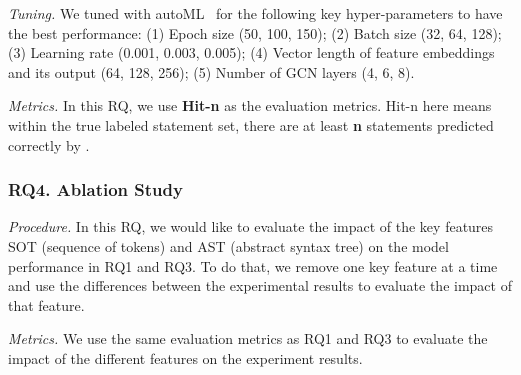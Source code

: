 {\em Tuning.} We tuned {\tool} with autoML~\cite{NNI} for the following key hyper-parameters to have the best performance: (1) Epoch size (50, 100, 150); (2) Batch size (32, 64, 128); (3) Learning rate (0.001, 0.003, 0.005); (4) Vector length of feature embeddings and its output (64, 128, 256); (5) Number of GCN layers (4, 6, 8).

{\em Metrics.} In this RQ, we use \textbf{Hit-n} as the evaluation metrics. Hit-n here means within the true labeled statement set, there are at least \textbf{n} statements predicted correctly by \tool.

\subsubsection{RQ4. Ablation Study}

{\em Procedure.} In this RQ, we would like to evaluate the impact of the key features SOT (sequence of tokens) and AST (abstract syntax tree) on the model performance in RQ1 and RQ3. To do that, we remove one key feature at a time and use the differences between the experimental results to evaluate the impact of that feature.

{\em Metrics.} We use the same evaluation metrics as RQ1 and RQ3 to evaluate the impact of the different features on the experiment results.